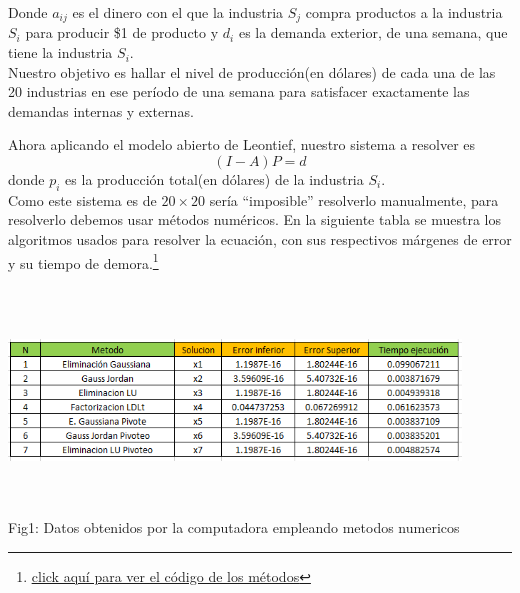 \documentclass[10pt,a4paper]{article}
\begin{document}
\begin{multicols}{2}
\noindent Donde $a_{ij}$ es el dinero con el que la industria $S_j$ compra productos a la industria $S_i$ para producir \$1 de producto y $d_i$ es la demanda exterior, de una semana, que tiene la industria $S_i$.\\
Nuestro objetivo es hallar el nivel de producción(en dólares) de cada una de las 20 industrias en ese período de una semana para satisfacer exactamente las demandas internas y externas.

\noindent Ahora aplicando el modelo abierto de Leontief, nuestro sistema a resolver es $$(I-A)P=d$$ donde $p_i$ es la producción total(en dólares) de la industria $S_i$.\\
Como este sistema es de $20\times20$ sería ``imposible'' resolverlo manualmente, para resolverlo debemos usar métodos numéricos. En la siguiente tabla se muestra los algoritmos usados para resolver la ecuación, con sus respectivos márgenes de error y su tiempo de demora.\footnote{\href{https://drive.google.com/drive/folders/1F-M1slvs1ibC-nhFcPin_ge0fLCHVb1c?usp=sharing}{\underline{click aquí para ver el código de los métodos}}}
\end{multicols}
\vspace*{1cm}

\begin{center}
	\centering
	\includegraphics[width=12cm,height=6cm]{TablasDatos.PNG}
	\\
	Fig1: Datos obtenidos por la computadora empleando metodos numericos 
\end{center}

\vspace*{1cm}
\end{document}
